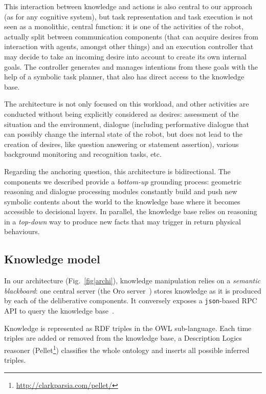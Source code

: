 \documentclass[letterpaper, 10 pt, conference]{ieeeconf}  %
\begin{document}
This interaction between knowledge and actions is also central to our approach
(as for any cognitive system), but task representation and task execution is
not seen as a monolithic, central function: it is one of the activities of the
robot, actually split between communication components (that can acquire
desires from interaction with agents, amongst other things) and an execution
controller that may decide to take an incoming desire into account to create
its own internal goals. The controller generates and manages intentions from
these goals with the help of a symbolic task planner, that also has direct
access to the knowledge base.

The architecture is not only focused on this workload, and other
activities are conducted without being explicitly considered as desires:
assessment of the situation and the environment, dialogue (including
performative dialogue that can possibly change the internal state of the robot,
but does not lead to the creation of desires,  like question answering or
statement assertion), various background monitoring and recognition tasks, etc.

Regarding the anchoring question, this architecture is bidirectional. The
components we described provide a \textit{bottom-up} grounding process:
geometric reasoning and dialogue processing modules constantly build and push
new symbolic contents about the world to the knowledge base where it becomes
accessible to decisional layers. In parallel, the knowledge base relies on
reasoning in a \textit{top-down} way to produce new facts that may trigger in
return physical behaviours.

\subsection{Knowledge model}

In our architecture (Fig.~\ref{fig|archi}), knowledge manipulation relies on a
\emph{semantic blackboard}: one central server (the {\sc Oro}
server~\cite{Lemaignan2010}) stores knowledge as it is produced by each of the
deliberative components. It conversely exposes a {\tt json}-based RPC API to
query the knowledge base~\cite{lemaignan2012kbapi}.

Knowledge is represented as RDF triples in the OWL sub-language. Each
time triples are added or removed from the knowledge base, a Description
Logics reasoner ({\sc Pellet}\footnote{\url{http://clarkparsia.com/pellet/}})
classifies the whole ontology and inserts all possible inferred triples.
\end{document}
